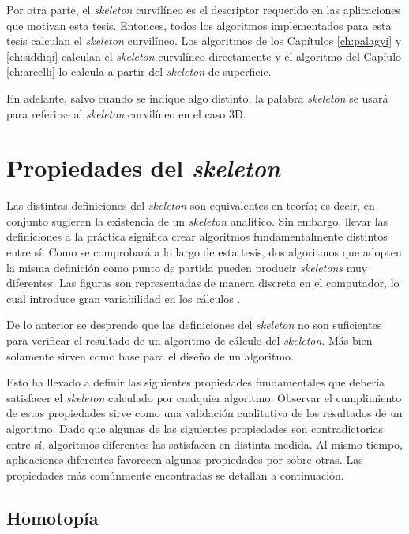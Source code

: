 Por otra parte, el \textit{skeleton} curvilíneo es el descriptor requerido en las aplicaciones que motivan esta tesis. Entonces, todos los algoritmos implementados para esta tesis calculan el \textit{skeleton} curvilíneo. Los algoritmos de los Capítulos \ref{ch:palagyi} y \ref{ch:siddiqi} calculan el \textit{skeleton} curvilíneo directamente y el algoritmo del Capíulo \ref{ch:arcelli} lo calcula a partir del \textit{skeleton} de superficie.

En adelante, salvo cuando se indique algo distinto, la palabra \textit{skeleton} se usará para referirse al \textit{skeleton} curvilíneo en el caso 3D.

\section{Propiedades del \textit{skeleton}} \label{sec:skelprops}

Las distintas definiciones del \textit{skeleton} son equivalentes en teoría; es decir, en conjunto sugieren la existencia de un \textit{skeleton} analítico. Sin embargo, llevar las definiciones a la práctica significa crear algoritmos fundamentalmente distintos entre sí. Como se comprobará a lo largo de esta tesis, dos algoritmos que adopten la misma definición como punto de partida pueden producir \textit{skeletons} muy diferentes. Las figuras son representadas de manera discreta en el computador, lo cual introduce gran variabilidad en los cálculos \cite{reniers2008computing}.

De lo anterior se desprende que las definiciones del \textit{skeleton} no son suficientes para verificar el resultado de un algoritmo de cálculo del \textit{skeleton}. Más bien solamente sirven como base para el diseño de un algoritmo.

Esto ha llevado a definir las siguientes propiedades fundamentales que debería satisfacer el \textit{skeleton} calculado por cualquier algoritmo. Observar el cumplimiento de estas propiedades sirve como una validación cualitativa de los resultados de un algoritmo. Dado que algunas de las siguientes propiedades son contradictorias entre sí, algoritmos diferentes las satisfacen en distinta medida. Al mismo tiempo, aplicaciones diferentes favorecen algunas propiedades por sobre otras. Las propiedades más comúnmente encontradas \cite{cornea2007curve,tagliasacchi2012mean} se detallan a continuación.

\subsection{Homotopía}

